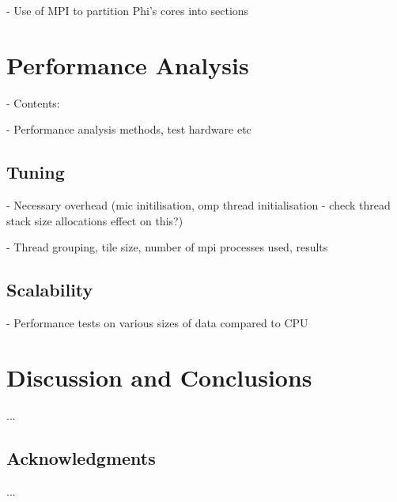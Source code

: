 \documentclass{easychair}
\begin{document}
\medskip
\noindent
- Use of MPI to partition Phi's cores into sections



\section{Performance Analysis}
\label{sect:performance}

\noindent
- Contents:

\noindent
- Performance analysis methods, test hardware etc


\subsection{Tuning}
\label{sect:tuning}

\noindent
- Necessary overhead (mic initilisation, omp thread initialisation - check thread stack size allocations effect on this?)

\noindent
- Thread grouping, tile size, number of mpi processes used, results

\subsection{Scalability}
\label{sect:scalability}

\noindent
- Performance tests on various sizes of data compared to CPU

\section{Discussion and Conclusions}
\label{sect:conclusions}

...

\subsection{Acknowledgments}
\label{sect:acks}

...

\end{document}
